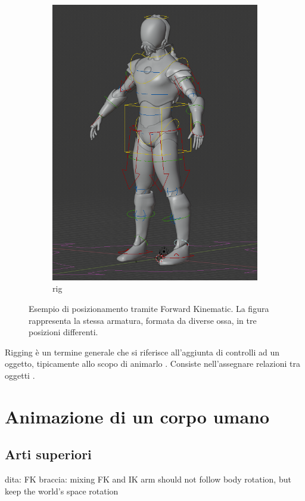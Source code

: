 \begin{figure}
\begin{subfigure}{.33\textwidth}
  \includegraphics[width=\linewidth]{Figures/rig2}
  \caption{rig}
  \label{fig:FK3}
\end{subfigure}
\decoRule
\caption[Rig]{Esempio di posizionamento tramite Forward Kinematic. La figura rappresenta la stessa armatura, formata da diverse ossa, in tre posizioni differenti.}
\label{fig:FK}
\end{figure}

Rigging è un termine generale che si riferisce all'aggiunta di controlli ad un oggetto, tipicamente allo scopo di animarlo \parencite{blendDoc}.
Consiste nell'assegnare relazioni tra oggetti \parencite{BlendTut}.
\section{Animazione di un corpo umano}
\subsection{Arti superiori}
dita: FK
braccia: mixing FK and IK
         arm should not follow body rotation, but keep the world's space rotation
